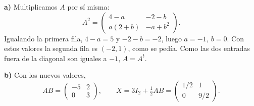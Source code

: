 \textbf{a)} Multiplicamos $A$ por sí misma:
\[
A^2=\begin{pmatrix}4-a&-2-b\\a(2+b)&-a+b^2\end{pmatrix}.
\]
Igualando la primera fila, $4-a=5$ y $-2-b=-2$, luego $\boxed{a=-1,\ b=0}$. Con estos valores la segunda fila es $(-2,1)$, como se pedía. Como las dos entradas fuera de la diagonal son iguales a $-1$, $A=A^t$.

\textbf{b)} Con los nuevos valores,
\[
AB=\begin{pmatrix}-5&2\\0&3\end{pmatrix},
\qquad
X=3I_2+\tfrac12 AB=\boxed{\begin{pmatrix}1/2&1\\0&9/2\end{pmatrix}}.
\]
